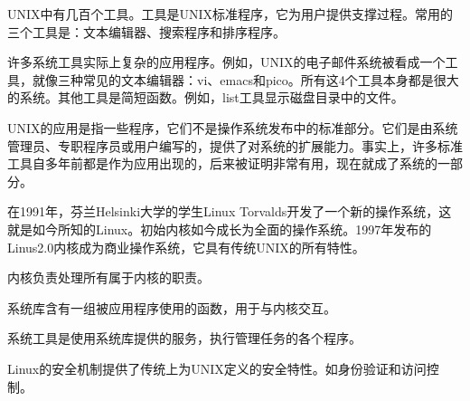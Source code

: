 UNIX中有几百个工具。工具是UNIX标准程序，它为用户提供支撑过程。常用的三个工具是：文本编辑器、搜索程序和排序程序。

许多系统工具实际上复杂的应用程序。例如，UNIX的电子邮件系统被看成一个工具，就像三种常见的文本编辑器：vi、emacs和pico。所有这4个工具本身都是很大的系统。其他工具是简短函数。例如，list工具显示磁盘目录中的文件。

UNIX的应用是指一些程序，它们不是操作系统发布中的标准部分。它们是由系统管理员、专职程序员或用户编写的，提供了对系统的扩展能力。事实上，许多标准工具自多年前都是作为应用出现的，后来被证明非常有用，现在就成了系统的一部分。

在1991年，芬兰Helsinki大学的学生Linux Torvalds开发了一个新的操作系统，这就是如今所知的Linux。初始内核如今成长为全面的操作系统。1997年发布的Linus2.0内核成为商业操作系统，它具有传统UNIX的所有特性。

内核负责处理所有属于内核的职责。

系统库含有一组被应用程序使用的函数，用于与内核交互。

系统工具是使用系统库提供的服务，执行管理任务的各个程序。

Linux的安全机制提供了传统上为UNIX定义的安全特性。如身份验证和访问控制。
